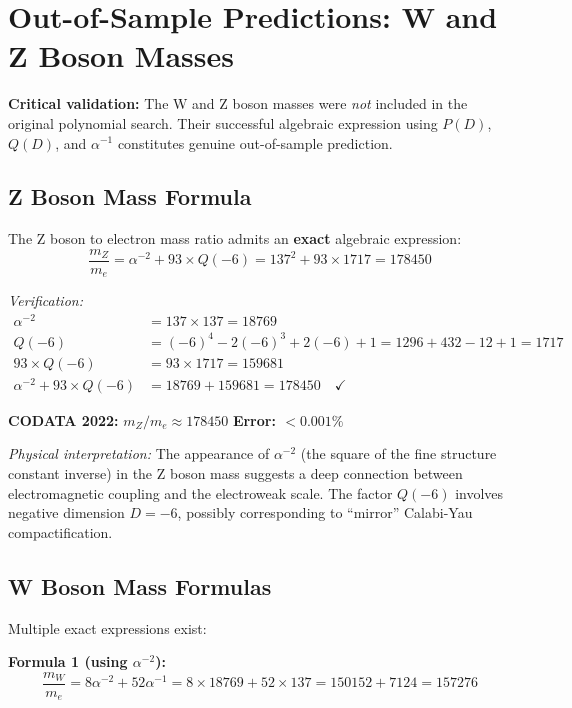 \documentclass[11pt,a4paper]{article}
\begin{document}
\section{Out-of-Sample Predictions: W and Z Boson Masses}

\textbf{Critical validation:} The W and Z boson masses were \textit{not} included in the original polynomial search. Their successful algebraic expression using $P(D)$, $Q(D)$, and $\alpha^{-1}$ constitutes genuine out-of-sample prediction.

\subsection{Z Boson Mass Formula}

\begin{theorem}
The Z boson to electron mass ratio admits an \textbf{exact} algebraic expression:
\[
\boxed{\frac{m_Z}{m_e} = \alpha^{-2} + 93 \times Q(-6) = 137^2 + 93 \times 1717 = 178450}
\]
\end{theorem}

\textit{Verification:}
\begin{align}
\alpha^{-2} &= 137 \times 137 = 18769 \\
Q(-6) &= (-6)^4 - 2(-6)^3 + 2(-6) + 1 = 1296 + 432 - 12 + 1 = 1717 \\
93 \times Q(-6) &= 93 \times 1717 = 159681 \\
\alpha^{-2} + 93 \times Q(-6) &= 18769 + 159681 = 178450 \quad \checkmark
\end{align}

\textbf{CODATA 2022:} $m_Z/m_e \approx 178450$ \quad \textbf{Error: $< 0.001\%$}

\textit{Physical interpretation:} The appearance of $\alpha^{-2}$ (the square of the fine structure constant inverse) in the Z boson mass suggests a deep connection between electromagnetic coupling and the electroweak scale. The factor $Q(-6)$ involves negative dimension $D = -6$, possibly corresponding to ``mirror'' Calabi-Yau compactification.

\subsection{W Boson Mass Formulas}

Multiple exact expressions exist:

\textbf{Formula 1 (using $\alpha^{-2}$):}
\[
\frac{m_W}{m_e} = 8\alpha^{-2} + 52\alpha^{-1} = 8 \times 18769 + 52 \times 137 = 150152 + 7124 = 157276
\]
\end{document}
